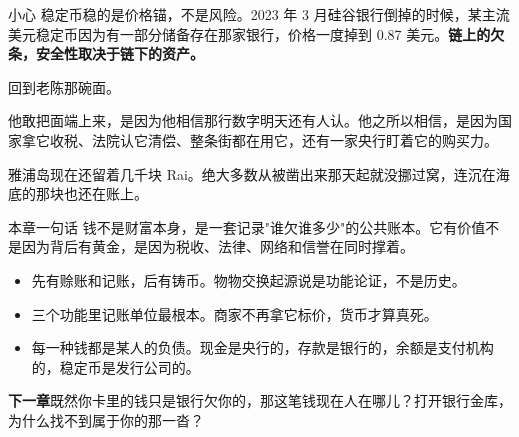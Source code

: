 \begin{warnbox}{小心}
稳定币稳的是价格锚，不是风险。2023 年 3 月硅谷银行倒掉的时候，某主流美元稳定币因为有一部分储备存在那家银行，价格一度掉到 0.87 美元。\textbf{链上的欠条，安全性取决于链下的资产。}

\end{warnbox}

\bookbreak

回到老陈那碗面。

他敢把面端上来，是因为他相信那行数字明天还有人认。他之所以相信，是因为国家拿它收税、法院认它清偿、整条街都在用它，还有一家央行盯着它的购买力。

雅浦岛现在还留着几千块 Rai。绝大多数从被凿出来那天起就没挪过窝，连沉在海底的那块也还在账上。

\begin{takeaway}{本章一句话}
钱不是财富本身，是一套记录"谁欠谁多少"的公共账本。它有价值不是因为背后有黄金，是因为税收、法律、网络和信誉在同时撑着。

\begin{itemize}
  \item 先有赊账和记账，后有铸币。物物交换起源说是功能论证，不是历史。
  \item 三个功能里记账单位最根本。商家不再拿它标价，货币才算真死。
  \item 每一种钱都是某人的负债。现金是央行的，存款是银行的，余额是支付机构的，稳定币是发行公司的。
\end{itemize}

\end{takeaway}

\begin{bridgebox}
\textbf{下一章}既然你卡里的钱只是银行欠你的，那这笔钱现在人在哪儿？打开银行金库，为什么找不到属于你的那一沓？
\end{bridgebox}

